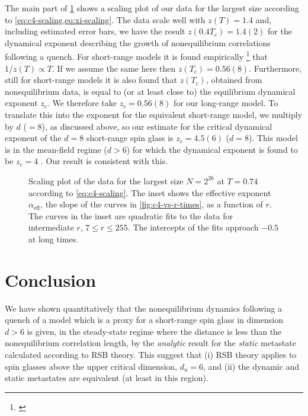 The main part of \cref{fig:c4-scaling} shows a scaling plot of our data for the
largest size according to \cref{eq:c4-scaling,eq:xi-scaling}. The data scale
well with $z(T)=1.4$ and, including estimated error bars, we have the result
$z(0.4 T_c)=1.4(2)$ for the dynamical exponent describing the growth of
nonequilibrium correlations following a quench. For short-range models it is
found empirically%
\footnote{%
  \textcite{%
    manssen2015aging,%
    rieger1993nonequilibrium,%
    marinari1996numerical,%
    yoshino2002extended%
  }
}
that $1/z(T) \propto T$. If we assume the same here then $z(T_c)=0.56(8)$.
Furthermore, still for short-range models it is also found that $z(T_c)$,
obtained from nonequilibrium data, is equal to (or at least close to)
the equilibrium dynamical exponent $z_c$. We therefore take $z_c=0.56(8)$
for our long-range model. To translate this into the exponent for the
equivalent short-range model, we multiply by $d$ ($=8$), as discussed above,
so our estimate for the critical dynamical exponent of the $d=8$ short-range
spin glass is $z_c=4.5(6)$ ($d=8$). This model is in the mean-field regime
($d>6$) for which the dynamical exponent is found to be $z_c=4$
\autocite{zippelius1984critical}. Our result is consistent with this.

\begin{figure}
  \centering
  
  \caption[
    Scaling plot of data for the dynamical correlation function $C_4(r,t)$ at
    different times for the 1-d long-range diluted spin glass with
    $\sigma=0.74$ at $T=0.4T_c$.
  ]
  {
    Scaling plot of the data for the largest size $N=2^{26}$ at $T=0.74$
    according to \cref{eq:c4-scaling}. The inset shows the effective exponent
    $\alpha_{\mathrm{eff}}$, the slope of the curves in
    \cref{fig:c4-vs-r-times}, as a function of $r$. The curves in the inset are
    quadratic fits to the data for intermediate $r$, $7 \leq r \leq 255$. The
    intercepts of the fits approach $-0.5$ at long times.
  }
  \label{fig:c4-scaling}
\end{figure}


\section{Conclusion}

We have shown quantitatively that the nonequilibrium dynamics following a
quench of a model which is a proxy for a short-range spin glass in dimension
$d>6$ is given, in the steady-state regime where the distance is less than the
nonequilibrium correlation length, by the \emph{analytic} result for the
\emph{static} metastate calculated according to RSB theory. This suggest that
(i) RSB theory applies to spin glasses above the upper critical dimension,
$d_u=6$, and (ii) the dynamic and static metastates are equivalent (at least in
this region).
